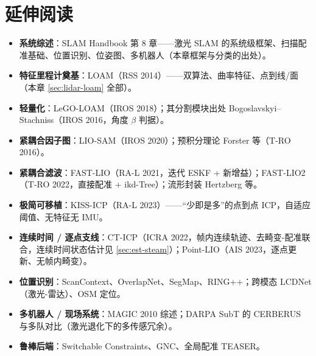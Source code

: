 \section*{延伸阅读}
\begin{itemize}
  \item \textbf{系统综述}：SLAM Handbook\cite{carlone2026handbook} 第 8 章——激光 SLAM 的系统级框架、扫描配准基础、位置识别、位姿图、多机器人（本章框架与分类的出处）。
  \item \textbf{特征里程计奠基}：LOAM\cite{zhang2014loam}（RSS 2014）——双算法、曲率特征、点到线/面（本章 \cref{sec:lidar-loam} 全部）。
  \item \textbf{轻量化}：LeGO-LOAM\cite{shan2018legoloam}（IROS 2018）；其分割模块出处 Bogoslavskyi–Stachniss\cite{bogoslavskyi2016fast}（IROS 2016，角度 $\beta$ 判据）。
  \item \textbf{紧耦合因子图}：LIO-SAM\cite{shan2020liosam}（IROS 2020）；预积分理论 Forster 等\cite{forster2017preintegration}（T-RO 2016）。
  \item \textbf{紧耦合滤波}：FAST-LIO\cite{xu2021fastlio}（RA-L 2021，迭代 ESKF + 新增益）；FAST-LIO2\cite{xu2022fastlio2}（T-RO 2022，直接配准 + ikd-Tree\cite{cai2021ikdtree}）；流形封装 Hertzberg 等\cite{hertzberg2013integrating}。
  \item \textbf{极简可移植}：KISS-ICP\cite{vizzo2023kissicp}（RA-L 2023）——“少即是多”的点到点 ICP，自适应阈值、无特征无 IMU。
  \item \textbf{连续时间 / 逐点支线}：CT-ICP\cite{dellenbach2022cticp}（ICRA 2022，帧内连续轨迹、去畸变-配准联合，连续时间状态估计见 \cref{sec:est-steam}）；Point-LIO\cite{he2023pointlio}（AIS 2023，逐点更新、无帧内畸变）。
  \item \textbf{位置识别}：ScanContext\cite{kim2018scancontext}、OverlapNet\cite{chen2020overlapnet}、SegMap\cite{dube2017segmap}、RING++\cite{lu2023ringpp}；跨模态 LCDNet\cite{cattaneo2022lcdnet}（激光-雷达）、OSM 定位\cite{cho2022osmloc}。
  \item \textbf{多机器人 / 现场系统}：MAGIC 2010 综述\cite{olson2012magic}；DARPA SubT 的 CERBERUS\cite{tranzatto2022cerberus} 与多队对比\cite{ebadi2022present}（激光退化下的多传感冗余）。
  \item \textbf{鲁棒后端}：Switchable Constraints\cite{sunderhauf2012switchable}、GNC\cite{yang2020gnc}、全局配准 TEASER\cite{yang2020teaser}。
\end{itemize}

